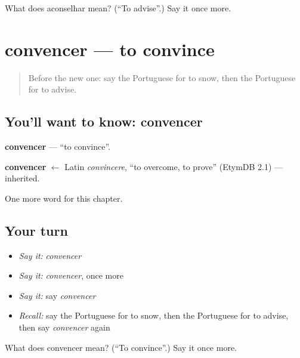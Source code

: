 \begin{tcolorbox}[breakable,colback=teal!4,colframe=teal!35!black,title={Before you move on}]
What does aconselhar mean? (\textquotedblleft{}To advise\textquotedblright{}.) Say it once more.
\end{tcolorbox}
\section[convencer]{convencer — to convince}

\label{lesson:PT-C234-convencer}



\begin{quote}
Before the new one: say the Portuguese for to snow, then the Portuguese for to advise.
\end{quote}

\subsection*{You'll want to know: convencer}
\textbf{convencer} — \textquotedblleft{}to convince\textquotedblright{}.

\begin{cousinweb}
\textbf{convencer} $\leftarrow$ Latin \emph{convincere}, \textquotedblleft{}to overcome, to prove\textquotedblright{} (EtymDB 2.1) — inherited.
\end{cousinweb}

\begin{grammarlens}[title={What you've built}]
One more word for this chapter.
\end{grammarlens}

\subsection*{Your turn}
\begin{itemize}
\raggedright
  \item \emph{Say it:} \emph{convencer}
  \item \emph{Say it:} \emph{convencer}, once more
  \item \emph{Say it:} say \emph{convencer}
  \item \emph{Recall:} say the Portuguese for to snow, then the Portuguese for to advise, then say \emph{convencer} again
\end{itemize}

\begin{tcolorbox}[breakable,colback=teal!4,colframe=teal!35!black,title={Before you move on}]
What does convencer mean? (\textquotedblleft{}To convince\textquotedblright{}.) Say it once more.
\end{tcolorbox}
